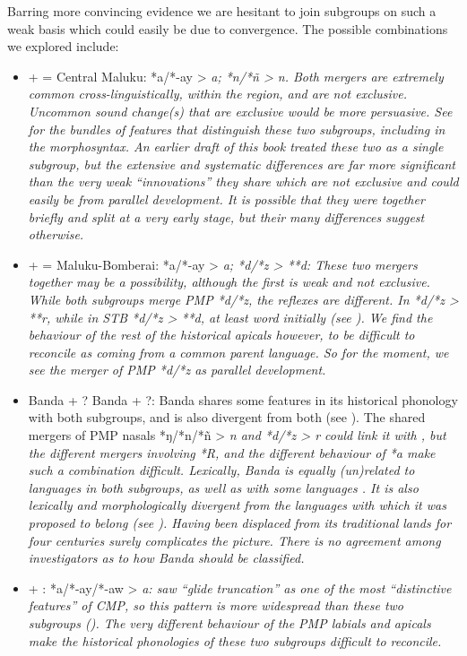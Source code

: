 Barring more convincing evidence we are hesitant to join subgroups
on such a weak basis which could easily be due to convergence.
The possible combinations we explored include:

\begin{itemize}
	\item	{} +  = Central Maluku: *a/*-ay
				> \it{a}; *n/*ñ > \it{n}.
				Both mergers are extremely common cross-linguistically,
				within the region, and are not exclusive.
				Uncommon sound change(s) that are exclusive would be more persuasive.
				See  for the bundles of features that distinguish
				these two subgroups, including in the morphosyntax.
				An earlier draft of this book treated these two as a single subgroup,
				but the extensive and systematic differences are far more significant
				than the very weak “innovations” they share which are not exclusive
				and could easily be from parallel development.
				It is possible that they were together briefly
				and split at a very early stage,
				but their many differences suggest otherwise.
	\item	{} +  = Maluku-Bomberai:
				*a/\mbox{*-ay} > \it{a}; *d/*z > **d: These two mergers together may
				be a possibility, although the first is weak and not exclusive.
				While both subgroups merge PMP *d/*z,
				the reflexes are different.
				In  *d/*z > **r,
				while in STB *d/*z > **d,
				at least word initially (see ).
				We find the behaviour of the rest of the historical apicals however,
				to be difficult to reconcile as coming from a common parent language.
				So for the moment,
				we see the merger of PMP *d/*z as parallel development.
	\item	Banda + ? Banda + ?:
				Banda shares some features in its historical phonology with both
				subgroups, and is also divergent from both (see ).
				The shared mergers of PMP nasals *ŋ/*n/*ñ > \it{n}
				and *d/*z > \it{r} could link it with ,
				but the different mergers involving *R,
				and the different behaviour of *a make such a combination difficult.
				Lexically, Banda is equally (un)related to languages in both
				subgroups, as well as with some  languages \citep{Hughes1987,LoskiLoski1989}.
				It is also lexically
				and morphologically divergent from the languages with which it
				was proposed to belong (see \citealp[141ff]{Collins1986}).
				Having been displaced from its traditional lands for four centuries
				surely complicates the picture.
				There is no agreement among investigators as to how Banda should be classified.
	\item	{} + : *a/*-ay/*-aw
				> \it{a}: \citet[264--266]{Blust1993} saw “glide truncation” as one
				of the most “distinctive features” of CMP,
				so this pattern is more widespread than these two subgroups ().
				The very different behaviour of the PMP labials
				and apicals make the historical phonologies of these two subgroups difficult to reconcile.
\end{itemize}

